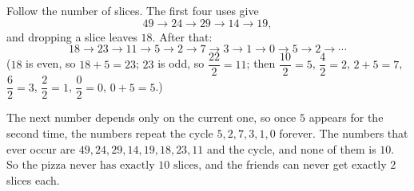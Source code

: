Follow the number of slices. The first four uses give
\[49\to24\to29\to14\to19,\]
and dropping a slice leaves $18$. After that:
\[18\to23\to11\to5\to2\to7\to3\to1\to0\to5\to2\to\cdots\]
($18$ is even, so $18+5=23$; $23$ is odd, so $\dfrac{22}{2}=11$; then $\dfrac{10}{2}=5$, $\dfrac42=2$, $2+5=7$, $\dfrac62=3$, $\dfrac22=1$, $\dfrac02=0$, $0+5=5$.)

The next number depends only on the current one, so once $5$ appears for the second time, the numbers repeat the cycle $5,2,7,3,1,0$ forever. The numbers that ever occur are $49,24,29,14,19,18,23,11$ and the cycle, and none of them is $10$. So $\boxed{\text{the pizza never has exactly }10\text{ slices}}$, and the friends can never get exactly $2$ slices each.
